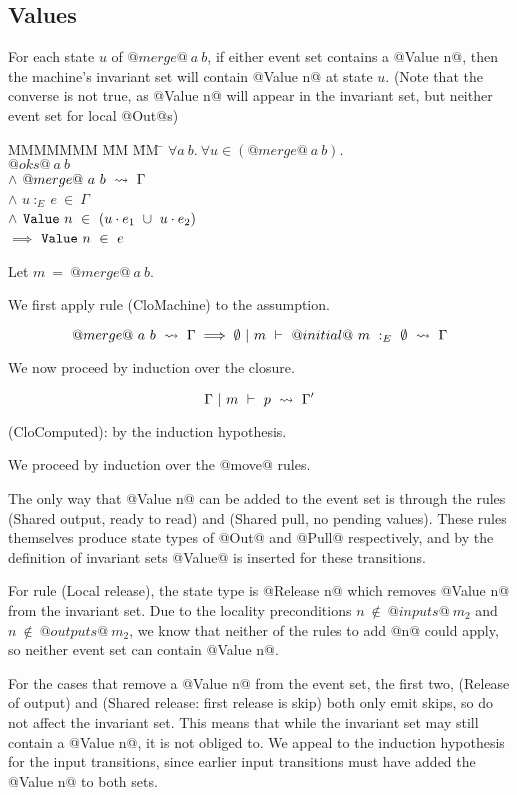 \subsection{Values}
For each state $u$ of $@merge@~a~b$, if either event set contains a @Value n@, then the machine's invariant set will contain @Value n@ at state $u$.
(Note that the converse is not true, as @Value n@ will appear in the invariant set, but neither event set for local @Out@s)



\begin{tabbing}
MMMMMMM \= MM \= MM \= \kill
$\forall a~b.\ \forall u \in (@merge@~a~b).$
\\
\>
\> $@oks@~a~b$
\\
\> $\wedge$
\> $@merge@~a~b ~\rightsquigarrow~ \Gamma$
\\
\> $\wedge$
\> $u~:_E~e~\in~\Gamma$
\\
\> $\wedge$
\> $\mathtt{Value}~n~\in~(u \cdot e_1~\cup~u \cdot e_2)$
\\
\> $\implies$
\> $\mathtt{Value}~n~\in~e$
\end{tabbing}

Let $m~=~@merge@~a~b$.

We first apply rule (CloMachine) to the assumption.

$$
@merge@~a~b ~\rightsquigarrow~ \Gamma
\implies
\emptyset ~|~ m ~\vdash~ @initial@~m~:_E~\emptyset ~\rightsquigarrow~ \Gamma
$$

We now proceed by induction over the closure.

$$
\Gamma ~|~ m ~\vdash~ p ~\rightsquigarrow~ \Gamma'
$$

(CloComputed): by the induction hypothesis.

We proceed by induction over the @move@ rules.

The only way that @Value n@ can be added to the event set is through the rules (Shared output, ready to read) and (Shared pull, no pending values).
These rules themselves produce state types of @Out@ and @Pull@ respectively, and by the definition of invariant sets @Value@ is inserted for these transitions.

For rule (Local release), the state type is @Release n@ which removes @Value n@ from the invariant set.
Due to the locality preconditions $n~\not\in~@inputs@~m_2$ and $n~\not\in~@outputs@~m_2$, we know that neither of the rules to add @n@ could apply, so neither event set can contain @Value n@.

For the cases that remove a @Value n@ from the event set, the first two, (Release of output) and (Shared release: first release is skip) both only emit skips, so do not affect the invariant set.
This means that while the invariant set may still contain a @Value n@, it is not obliged to.
We appeal to the induction hypothesis for the input transitions, since earlier input transitions must have added the @Value n@ to both sets.

